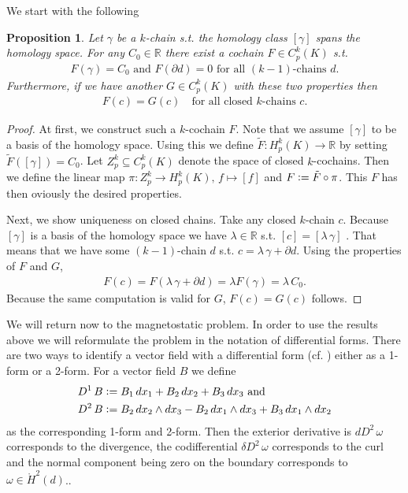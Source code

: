 \documentclass[12pt,a4paper]{article}
\newtheorem{proposition}{Proposition}
\theoremstyle{definition}
\newcommand{\real}{\mathbb{R}}
\begin{document}
We start with the following
\begin{proposition}\label{uniqueness_cochain}
    Let $\gamma$ be a $k$-chain s.t. the homology class $[\gamma]$ 
    spans the homology space. For any $C_0 \in \real$ 
    there exist a cochain $F \in C^k_p(K)$ s.t.
    \begin{align*}
    F(\gamma) = C_0 \text{ and } F(\partial d) = 0 
    \text{ for all } (k-1) \text{-chains } d.
    \end{align*}
    Furthermore, if we have another $G \in C^k_p(K)$ with these two properties
    then 
    \begin{align*}
        F(c) = G(c) \quad \text{for all closed } k \text{-chains } c.
    \end{align*}
\end{proposition} 
\begin{proof}
    At first, we construct such a $k$-cochain $F$. Note that we assume
    $[\gamma]$ to be a basis of the homology space. Using this
    we define $\tilde{F}: H^k_p(K) \rightarrow \real$ by setting 
    $\tilde{F}([\gamma]) = C_0$. Let $Z^k_p \subseteq C^k_p(K)$ 
    denote the space of closed $k$-cochains. Then we define the linear map
    $\pi: Z^k_p \rightarrow H^k_p(K), \, f \mapsto [f]$ and 
    $F \vcentcolon= \tilde{F} \circ \pi$. This $F$ has then oviously the desired
    properties.

    Next, we show uniqueness on closed chains.
    Take any closed $k$-chain $c$. Because $[\gamma]$ is a basis of the 
    homology space we have $\lambda \in \real$ s.t. $[c] = [\lambda \, \gamma]$ 
    . That means that we have
    some $(k-1)$-chain $d$ s.t. $c = \lambda \, \gamma + \partial d$. Using the 
    properties of $F$ and $G$,
    \begin{align*}
        F(c) = F(\lambda \, \gamma + \partial d) = 
        \lambda F(\gamma) = \lambda \, C_0.
    \end{align*}
    Because the same computation is valid for $G$, $F(c) = G(c)$ follows.
\end{proof}


We will return now to the magnetostatic problem. In order to use the results
above we will reformulate the problem in the notation of differential forms.
There are two ways to identify a vector field with a differential form 
(cf. \cite[Table 6.1 and p.70]{arnold}) either as a 1-form or a 2-form. 
For a vector field $B$ we define
\begin{align*}
    D^1\, B &\vcentcolon= B_1 \, dx_1 + B_2 \, dx_2 + B_3\, dx_3 \text{ and}\\
    D^2\, B &\vcentcolon= B_2 \, dx_2 \wedge dx_3 - B_2 \, dx_1 \wedge dx_3
        + B_3 \, dx_1 \wedge dx_2
\end{align*} 
as the corresponding 1-form and 2-form. 
Then the exterior derivative is $dD^2\,\omega$ corresponds to the divergence,
the codifferential $\delta D^2\,\omega$ 
corresponds to the curl and the normal component
being zero on the boundary corresponds 
to $\omega \in \mathring{H}^2(d)$.\cite{}. 
\end{document}
